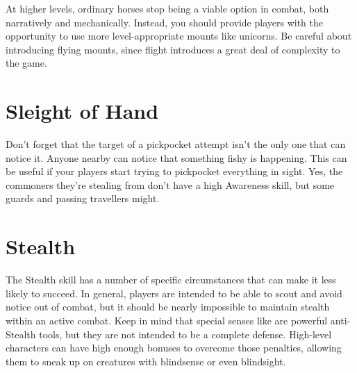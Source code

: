     At higher levels, ordinary horses stop being a viable option in combat, both narratively and mechanically.
    Instead, you should provide players with the opportunity to use more level-appropriate mounts like unicorns.
    Be careful about introducing flying mounts, since flight introduces a great deal of complexity to the game.

\section{Sleight of Hand}
    Don't forget that the target of a pickpocket attempt isn't the only one that can notice it.
    Anyone nearby can notice that something fishy is happening.
    This can be useful if your players start trying to pickpocket everything in sight.
    Yes, the commoners they're stealing from don't have a high Awareness skill, but some guards and passing travellers might.


\section{Stealth}
    The Stealth skill has a number of specific circumstances that can make it less likely to succeed.
    In general, players are intended to be able to scout and avoid notice out of combat, but it should be nearly impossible to maintain stealth within an active combat.
    Keep in mind that special senses like  are powerful anti-Stealth tools, but they are not intended to be a complete defense.
    High-level characters can have high enough bonuses to overcome those penalties, allowing them to sneak up on creatures with blindsense or even blindsight.
